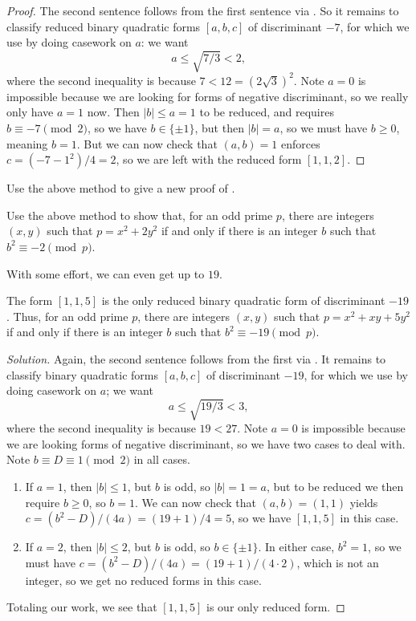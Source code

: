 \documentclass[../notes.tex]{subfiles}
\begin{document}
\begin{proof}
	The second sentence follows from the first sentence via . So it remains to classify reduced binary quadratic forms $[a,b,c]$ of discriminant $-7$, for which we use  by doing casework on $a$: we want
	\[a\le\sqrt{7/3}<2,\]
	where the second inequality is because $7<12=(2\sqrt3)^2$. Note $a=0$ is impossible because we are looking for forms of negative discriminant, so we really only have $a=1$ now. Then $\left|b\right|\le a=1$ to be reduced, and  requires $b\equiv-7\pmod2$, so we have $b\in\{\pm1\}$, but then $\left|b\right|=a$, so we must have $b\ge0$, meaning $b=1$. But we can now check that $(a,b)=1$ enforces $c=\left(-7-1^2\right)/4=2$, so we are left with the reduced form $[1,1,2]$.
\end{proof}
\begin{exercise}
	Use the above method to give a new proof of .
\end{exercise}
\begin{exercise} \label{exe:primes-of-form-2}
	Use the above method to show that, for an odd prime $p$, there are integers $(x,y)$ such that $p=x^2+2y^2$ if and only if there is an integer $b$ such that $b^2\equiv-2\pmod p$.
\end{exercise}
With some effort, we can even get up to $19$.
\begin{example}
	The form $[1,1,5]$ is the only reduced binary quadratic form of discriminant $-19$. Thus, for an odd prime $p$, there are integers $(x,y)$ such that $p=x^2+xy+5y^2$ if and only if there is an integer $b$ such that $b^2\equiv-19\pmod p$.
\end{example}
\begin{proof}[Solution]
	Again, the second sentence follows from the first via . It remains to classify binary quadratic forms $[a,b,c]$ of discriminant $-19$, for which we use  by doing casework on $a$; we want
	\[a\le\sqrt{19/3}<3,\]
	where the second inequality is because $19<27$. Note $a=0$ is impossible because we are looking forms of negative discriminant, so we have two cases to deal with. Note $b\equiv D\equiv1\pmod2$ in all cases.
	\begin{enumerate}
		\item If $a=1$, then $\left|b\right|\le1$, but $b$ is odd, so $\left|b\right|=1=a$, but to be reduced we then require $b\ge0$, so $b=1$. We can now check that $(a,b)=(1,1)$ yields $c=\left(b^2-D\right)/(4a)=(19+1)/4=5$, so we have $[1,1,5]$ in this case.
		\item If $a=2$, then $\left|b\right|\le2$, but $b$ is odd, so $b\in\{\pm1\}$. In either case, $b^2=1$, so we must have $c=\left(b^2-D\right)/(4a)=(19+1)/(4\cdot2)$, which is not an integer, so we get no reduced forms in this case.
	\end{enumerate}
	Totaling our work, we see that $[1,1,5]$ is our only reduced form.
\end{proof}
\end{document}
